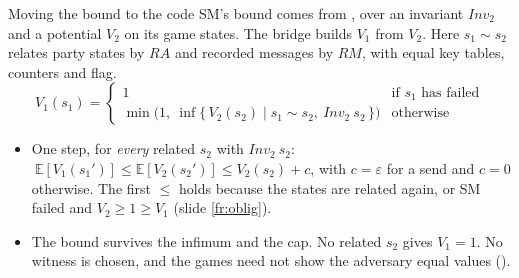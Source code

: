 \begin{frame}[t]{Moving the bound to the code}
  \footnotesize
  SM's bound comes from , over an invariant
  $\mathit{Inv}_2$ and a potential $V_2$ on its game states. The bridge builds $V_1$ from $V_2$.
  Here $s_1 \sim s_2$ relates party states by $RA$ and recorded messages by $RM$, with equal key
  tables, counters and flag.
  \[
    V_1(s_1) =
    \begin{cases}
      1 & \text{if } s_1 \text{ has failed} \\
      \min\bigl(1,\ \inf\{\, V_2(s_2) \mid s_1 \sim s_2,\ \mathit{Inv}_2\ s_2 \,\}\bigr) & \text{otherwise}
    \end{cases}
  \]
  \centering
  \vspace{0.2em}

  \begin{itemize}\footnotesize
    \item One step, for \emph{every} related $s_2$ with $\mathit{Inv}_2\ s_2$:
      $\ \mathbb{E}[V_1(s_1')] \le \mathbb{E}[V_2(s_2')] \le V_2(s_2) + c$, with $c = \varepsilon$
      for a send and $c = 0$ otherwise. The first $\le$ holds because the states are related again,
      or SM failed and $V_2 \ge 1 \ge V_1$ (slide \ref{fr:oblig}).
    \item The bound survives the infimum and the cap. No related $s_2$ gives $V_1 = 1$. No witness
      is chosen, and the games need not show the adversary equal values
      ().
  \end{itemize}
\end{frame}

